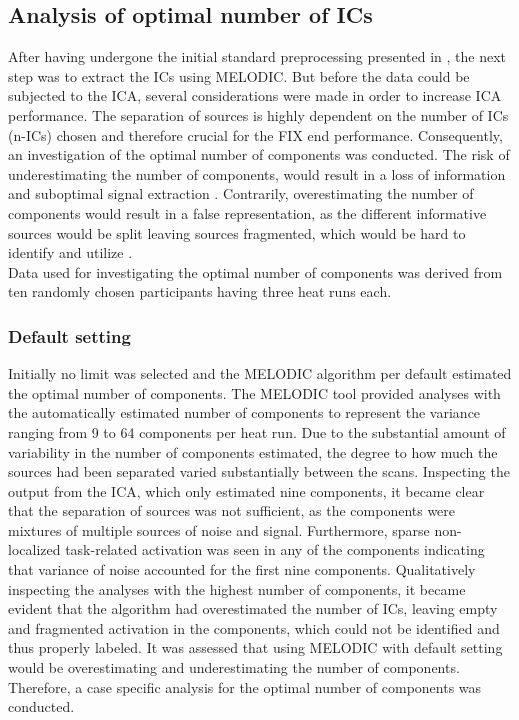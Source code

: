 
\subsection{Analysis of optimal number of ICs} \label{sec:optimal}

After having undergone the initial standard preprocessing presented in , the next step was to extract the ICs using MELODIC. But before the data could be subjected to the ICA, several considerations were made in order to increase ICA performance. The separation of sources is highly dependent on the number of ICs (n-ICs) chosen and therefore crucial for the FIX end performance. Consequently, an investigation of the optimal number of components was conducted. The risk of underestimating the number of components, would result in a loss of information and suboptimal signal extraction \cite{Beckmann2004}. Contrarily, overestimating the number of components would result in a false representation, as the different informative sources would be split leaving sources fragmented, which would be hard to identify and utilize \cite{Beckmann2004,Li2007}. \\
Data used for investigating the optimal number of components was derived from ten randomly chosen participants having three heat runs each. 


\subsubsection{Default setting}
Initially no limit was selected and the MELODIC algorithm per default estimated the optimal number of components. \cite{FMRIB2016} The MELODIC tool provided analyses with the automatically estimated number of components to represent the variance ranging from 9 to 64 components per heat run. Due to the substantial amount of variability in the number of components estimated, the degree to how much the sources had been separated varied substantially between the scans. Inspecting the output from the ICA, which only estimated nine components, it became clear that the separation of sources was not sufficient, as the components were mixtures of multiple sources of noise and signal. Furthermore, sparse non-localized task-related activation was seen in any of the components indicating that variance of noise accounted for the first nine components. Qualitatively inspecting the analyses with the highest number of components, it became evident that the algorithm had overestimated the number of ICs, leaving empty and fragmented activation in the components, which could not be identified and thus properly labeled. It was assessed that using MELODIC with default setting would be overestimating and underestimating the number of components. Therefore, a case specific analysis for the optimal number of components was conducted. 

